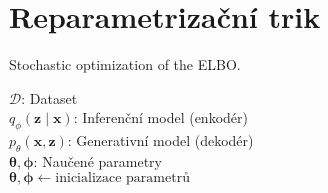 \section{Reparametrizační trik}

\begin{algorithm}[hbt!]
    \caption{Stochastic optimization of the ELBO.}\label{alg:reparam_trick}
        \KwData{}
                \hspace{6mm}$\mathcal{D}$: Dataset\\
                \hspace{6mm}$q_\phi(\textbf{z}\mid\textbf{x})$: Inferenční model (enkodér)\\
                \hspace{6mm}$p_\theta(\textbf{x}, \textbf{z})$: Generativní model (dekodér)\\
        \KwResult{}
        \hspace{6mm}$\boldsymbol{\theta}, \boldsymbol{\phi}$: Naučené parametry\\

        $\boldsymbol{\theta}, \boldsymbol{\phi} \gets \text{inicializace parametrů}$

\end{algorithm}